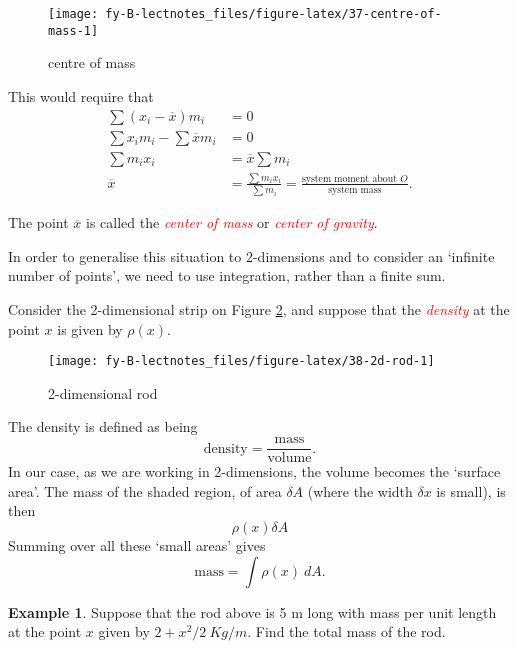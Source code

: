 \documentclass[
  11pt,
  oneside]{book}
\newcommand{\slide}{}
\theoremstyle{definition}
\theoremstyle{definition}
\newtheorem{example}{Example}[chapter]
\theoremstyle{definition}
\theoremstyle{definition}
\theoremstyle{remark}
\begin{document}
\begin{figure}

{\centering \texttt{[image: fy-B-lectnotes\_files/figure-latex/37-centre-of-mass-1]} 

}

\caption{centre of mass}\label{fig:37-centre-of-mass}
\end{figure}

This would require that
\begin{align*}
\sum(x_i-\overline x)m_i& = 0\\
\sum x_i m_i-\sum{\overline x}m_i& = 0\\
\sum m_ix_i&=\overline x\sum m_i\\
\overline x&=\frac{\sum m_ix_i}{\sum m_i}=\frac{\text{system moment about $O$}}{\text{system mass}}.
\end{align*}

The point \(\overline x\) is called the \textcolor{red}{\em center of mass} or \textcolor{red}{\em center of gravity}.
\slide

In order to generalise this situation to 2-dimensions and to consider an `infinite number of points', we need to use integration, rather than a finite sum.

Consider the 2-dimensional strip on Figure \ref{fig:38-2d-rod}, and suppose that the \textcolor{red}{\em density} at the point \(x\) is given by \(\rho(x)\).

\begin{figure}

{\centering \texttt{[image: fy-B-lectnotes\_files/figure-latex/38-2d-rod-1]} 

}

\caption{2-dimensional rod}\label{fig:38-2d-rod}
\end{figure}
\slide

The density is defined as being
\[
\text{density} = \frac{\text{mass}}{\text{volume}}.
\]
In our case, as we are working in 2-dimensions, the volume becomes the `surface area'. The mass of the shaded region, of area \(\delta A\) (where the width \(\delta x\) is small), is then
\[
\rho(x)\delta A
\]
Summing over all these `small areas' gives
\[
\text{mass} = \int\rho(x)\ dA.
\]
\slide

\begin{example}
Suppose that the rod above is 5 m long with mass per unit length at the point \(x\) given by \(2+x^2/2\ Kg/m\). Find the total mass of the rod.
\end{example}
\end{document}
